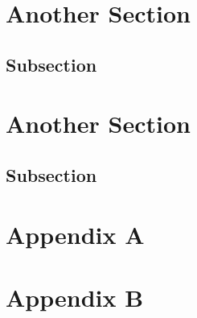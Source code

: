 \documentclass[12pt]{article}
\begin{document}
\section{Another Section}
\blindtext
\par
\blindtext
\subsection{Subsection}
\blindtext
\section{Another Section}
\blindtext
\par
\blindtext
\subsection{Subsection}
\blindtext

\section{Appendix A}
\blindtext
\blinditemize
\section{Appendix B}
\blindtext

\printbibliography
\end{document}
